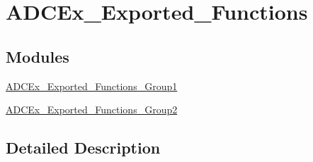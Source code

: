 \hypertarget{group___a_d_c_ex___exported___functions}{}\section{A\+D\+C\+Ex\+\_\+\+Exported\+\_\+\+Functions}
\label{group___a_d_c_ex___exported___functions}
\subsection*{Modules}
\begin{DoxyCompactItemize}
\item 
\hyperlink{group___a_d_c_ex___exported___functions___group1}{A\+D\+C\+Ex\+\_\+\+Exported\+\_\+\+Functions\+\_\+\+Group1}
\item 
\hyperlink{group___a_d_c_ex___exported___functions___group2}{A\+D\+C\+Ex\+\_\+\+Exported\+\_\+\+Functions\+\_\+\+Group2}
\end{DoxyCompactItemize}


\subsection{Detailed Description}
